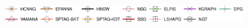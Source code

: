     \newcommand{\soneMs}{0.155}
\renewcommand{\soneM}{0.25}
\renewcommand{\spbf}{0.0in}
\begin{figure}[!htb]
	\captionsetup{justification=centering}
	\centering
		\begin{subfigure}{\textwidth}
			\includegraphics[width=\textwidth]{../img/Experiments/legendall.png}
		\end{subfigure}	
 
	\begin{minipage}{\textwidth}
 \centering
		\captionsetup{justification=centering}
		\captionsetup[subfigure]{justification=centering}

\end{minipage}
\end{figure}
